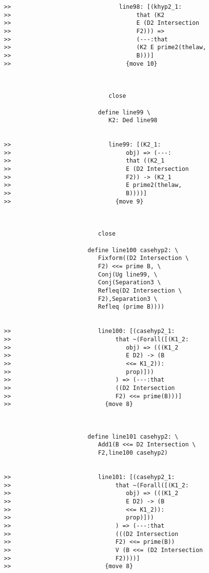 \documentclass[12pt]{article}
\begin{document}
\begin{verbatim}
>>                               line98: [(khyp2_1:
>>                                    that (K2
>>                                    E (D2 Intersection
>>                                    F2))) =>
>>                                    (---:that
>>                                    (K2 E prime2(thelaw,
>>                                    B)))]
>>                                 {move 10}



                              close

                           define line99 \
                              K2: Ded line98


>>                            line99: [(K2_1:
>>                                 obj) => (---:
>>                                 that ((K2_1
>>                                 E (D2 Intersection
>>                                 F2)) -> (K2_1
>>                                 E prime2(thelaw,
>>                                 B))))]
>>                              {move 9}



                           close

                        define line100 casehyp2: \
                           Fixform((D2 Intersection \
                           F2) <<= prime B, \
                           Conj(Ug line99, \
                           Conj(Separation3 \
                           Refleq(D2 Intersection \
                           F2),Separation3 \
                           Refleq (prime B))))


>>                         line100: [(casehyp2_1:
>>                              that ~(Forall([(K1_2:
>>                                 obj) => (((K1_2
>>                                 E D2) -> (B
>>                                 <<= K1_2)):
>>                                 prop)]))
>>                              ) => (---:that
>>                              ((D2 Intersection
>>                              F2) <<= prime(B)))]
>>                           {move 8}



                        define line101 casehyp2: \
                           Add1(B <<= D2 Intersection \
                           F2,line100 casehyp2)


>>                         line101: [(casehyp2_1:
>>                              that ~(Forall([(K1_2:
>>                                 obj) => (((K1_2
>>                                 E D2) -> (B
>>                                 <<= K1_2)):
>>                                 prop)]))
>>                              ) => (---:that
>>                              (((D2 Intersection
>>                              F2) <<= prime(B))
>>                              V (B <<= (D2 Intersection
>>                              F2))))]
>>                           {move 8}




\end{verbatim}
\end{document}
